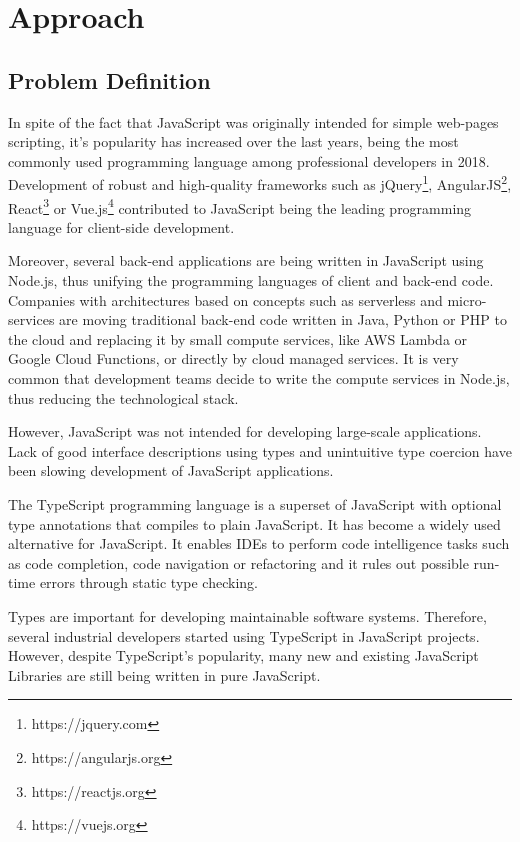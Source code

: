 \chapter{Approach}\label{chap:approach}

\section{Problem Definition} \label{sec:problem-definition}
In spite of the fact that JavaScript was originally intended for simple web-pages scripting, it's popularity has increased over the last years, being the most commonly used programming language among professional developers in 2018. Development of robust and high-quality frameworks such as jQuery\footnote{https://jquery.com}, AngularJS\footnote{https://angularjs.org}, React\footnote{https://reactjs.org} or Vue.js\footnote{https://vuejs.org} contributed to JavaScript being the leading programming language for client-side development. 

Moreover, several back-end applications are being written in JavaScript using Node.js, thus unifying the programming languages of client and back-end code. Companies with architectures based on concepts such as serverless and micro-services are moving traditional back-end code written in Java, Python or PHP to the cloud and replacing it by small compute services, like AWS Lambda or Google Cloud Functions, or directly by cloud managed services. It is very common that development teams decide to write the compute services in Node.js, thus reducing the technological stack.

However, JavaScript was not intended for developing large-scale applications. Lack of good interface descriptions using types and unintuitive type coercion have been slowing development of JavaScript applications.

The TypeScript programming language is a superset of JavaScript with optional type annotations that compiles to plain JavaScript. It has become a widely used alternative for JavaScript. It enables IDEs to perform code intelligence tasks such as code completion, code navigation or refactoring and it rules out possible run-time errors through static type checking.

Types are important for developing maintainable software systems. Therefore, several industrial developers started using TypeScript in JavaScript projects. However, despite TypeScript's popularity, many new and existing JavaScript Libraries are still being written in pure JavaScript.

